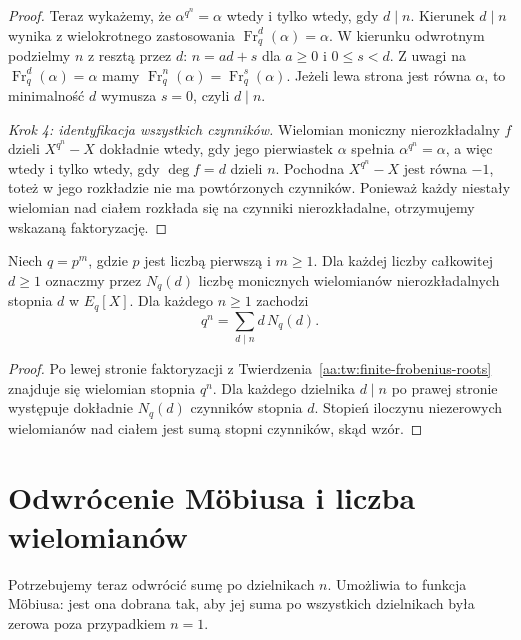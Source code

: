 \begin{proof}
Teraz wykażemy, że
$\alpha^{q^n}=\alpha$ wtedy i tylko wtedy, gdy $d\mid n$.
Kierunek $d\mid n$ wynika z wielokrotnego zastosowania
$\operatorname{Fr}_q^d(\alpha)=\alpha$.
W kierunku odwrotnym podzielmy $n$ z resztą przez $d$:
$n=ad+s$ dla $a\ge0$ i $0\le s<d$.
Z uwagi na $\operatorname{Fr}_q^d(\alpha)=\alpha$
mamy $\operatorname{Fr}_q^n(\alpha)=
\operatorname{Fr}_q^s(\alpha)$.
Jeżeli lewa strona jest równa $\alpha$, to minimalność
$d$ wymusza $s=0$, czyli $d\mid n$.

\emph{Krok 4: identyfikacja wszystkich czynników.}
Wielomian moniczny nierozkładalny $f$ dzieli
$X^{q^n}-X$ dokładnie wtedy, gdy jego pierwiastek
$\alpha$ spełnia $\alpha^{q^n}=\alpha$, a więc
wtedy i tylko wtedy, gdy $\deg f=d$ dzieli $n$.
Pochodna $X^{q^n}-X$ jest równa $-1$, toteż
w jego rozkładzie nie ma powtórzonych czynników.
Ponieważ każdy niestały wielomian nad ciałem rozkłada się
na czynniki nierozkładalne, otrzymujemy wskazaną
faktoryzację.
\end{proof}

\begin{wniosek}\label{aa:cor:finite-degree-count}
Niech $q=p^m$, gdzie $p$ jest liczbą pierwszą i $m\ge1$.
Dla każdej liczby całkowitej $d\ge1$ oznaczmy przez
$N_q(d)$ liczbę monicznych wielomianów nierozkładalnych
stopnia $d$ w $E_q[X]$. Dla każdego $n\ge1$ zachodzi
\[
q^n=\sum_{d\mid n}d\,N_q(d).
\]
\end{wniosek}
\begin{proof}
Po lewej stronie faktoryzacji z
Twierdzenia~\ref{aa:tw:finite-frobenius-roots} znajduje się
wielomian stopnia $q^n$. Dla każdego dzielnika $d\mid n$
po prawej stronie występuje dokładnie $N_q(d)$ czynników
stopnia $d$. Stopień iloczynu niezerowych wielomianów
nad ciałem jest sumą stopni czynników, skąd wzór.
\end{proof}

\section{Odwrócenie Möbiusa i liczba wielomianów}

Potrzebujemy teraz odwrócić sumę po dzielnikach $n$.
Umożliwia to funkcja Möbiusa: jest ona dobrana tak, aby
jej suma po wszystkich dzielnikach była zerowa poza
przypadkiem $n=1$.

